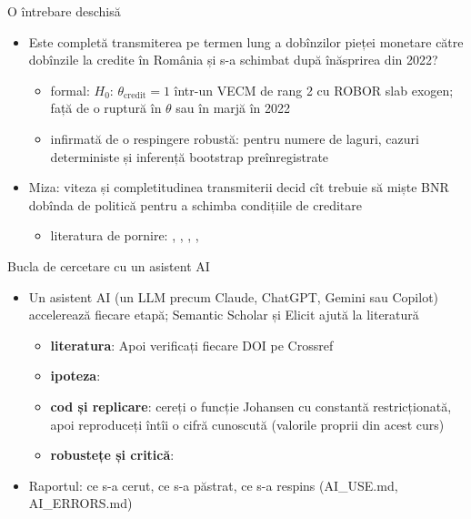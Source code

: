 \begin{frame}{O întrebare deschisă}
\itemsize{\small}
\begin{itemize}
    \item Este completă transmiterea pe termen lung a dobînzilor pieței monetare către dobînzile la credite în România și s-a schimbat după înăsprirea din 2022?
    \begin{itemize}
        \item formal: $H_0$: $\theta_{\text{credit}} = 1$ într-un VECM de rang 2 cu ROBOR slab exogen; față de o ruptură în $\theta$ sau în marjă în 2022
        \item infirmată de o respingere robustă: pentru numere de laguri, cazuri deterministe și inferență bootstrap preînregistrate
    \end{itemize}
    \item Miza: viteza și completitudinea transmiterii decid cît trebuie să miște BNR dobînda de politică pentru a schimba condițiile de creditare
    \begin{itemize}
        \item literatura de pornire: , , , , 
    \end{itemize}
\end{itemize}
\end{frame}

\begin{frame}{Bucla de cercetare cu un asistent AI}
\itemsize{\footnotesize}
\begin{itemize}
    \item Un asistent AI (un LLM precum Claude, ChatGPT, Gemini sau Copilot) accelerează fiecare etapă; Semantic Scholar și Elicit ajută la literatură
    \begin{itemize}
        \item \textbf{literatura}:  Apoi verificați fiecare DOI pe Crossref
        \item \textbf{ipoteza}: 
        \item \textbf{cod și replicare}: cereți o funcție Johansen cu constantă restricționată, apoi reproduceți întîi o cifră cunoscută (valorile proprii din acest curs)
        \item \textbf{robustețe și critică}: 
    \end{itemize}
    \item Raportul: ce s-a cerut, ce s-a păstrat, ce s-a respins (AI\_USE.md, AI\_ERRORS.md)
\end{itemize}
\end{frame}

